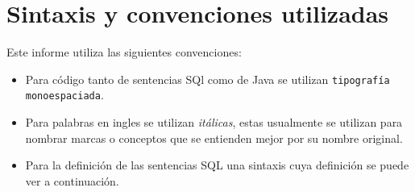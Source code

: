 \chapter{Sintaxis y convenciones utilizadas}
Este informe utiliza las siguientes convenciones:
%
\begin{itemize}
\item Para código tanto de sentencias SQl como de Java se utilizan \verb=tipografía monoespaciada=.
%
\item Para palabras en ingles se utilizan \textit{itálicas}, estas usualmente se utilizan para nombrar marcas o conceptos que se entienden mejor por su nombre original.
%
\item Para la definición de las sentencias SQL una sintaxis cuya definición se puede ver a continuación.
\end{itemize}
%
